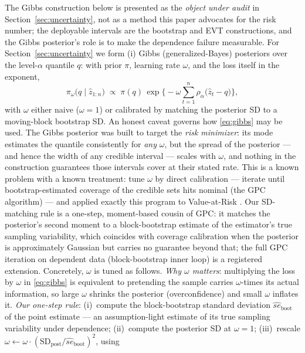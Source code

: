 \documentclass[11pt]{article}
\theoremstyle{remark}
\begin{document}
The Gibbs construction below is presented as the \emph{object under
audit} in Section~\ref{sec:uncertainty}, not as a method this paper
advocates for the risk number; the deployable intervals are the bootstrap
and EVT constructions, and the Gibbs posterior's role is to make the
dependence failure measurable. For Section~\ref{sec:uncertainty} we form (i) Gibbs (generalized-Bayes)
posteriors over the level-$\alpha$ quantile $q$: with prior $\pi$,
learning rate $\omega$, and the loss itself in the exponent,
\begin{equation}
\pi_\omega\big(q \mid \widehat{z}_{1:n}\big) \;\propto\;
\pi(q)\,
\exp\Big\{-\omega \sum_{t=1}^{n}
\rho_\alpha\big(\widehat{z}_t - q\big)\Big\},
\label{eq:gibbs}
\end{equation}
with $\omega$ either naive ($\omega=1$) or calibrated by matching the
posterior SD to a moving-block bootstrap SD. An honest caveat governs
how \eqref{eq:gibbs} may be used. The Gibbs posterior was built to
target the \emph{risk minimizer}: its mode estimates the quantile
consistently for \emph{any} $\omega$, but the spread of the posterior
--- and hence the width of any credible interval --- scales with
$\omega$, and nothing in the construction guarantees those intervals
cover at their stated rate. This is a known problem with a known
treatment: \citet{syring2019gpc} tune $\omega$ by direct calibration
--- iterate until bootstrap-estimated coverage of the credible sets
hits nominal (the GPC algorithm) --- and applied exactly this program
to Value-at-Risk \citep{syringmartin2019var}. Our SD-matching rule is a
one-step, moment-based cousin of GPC: it matches the posterior's
second moment to a block-bootstrap estimate of the estimator's true
sampling variability, which coincides with coverage calibration when
the posterior is approximately Gaussian but carries no guarantee
beyond that; the full GPC iteration on dependent data (block-bootstrap
inner loop) is a registered extension. Concretely, $\omega$ is tuned as
follows. \emph{Why $\omega$ matters}: multiplying the loss by $\omega$
in \eqref{eq:gibbs} is equivalent to pretending the sample carries
$\omega$-times its actual information, so large $\omega$ shrinks the
posterior (overconfidence) and small $\omega$ inflates it. \emph{Our
one-step rule}: (i)~compute the block-bootstrap standard deviation
$\widehat{se}_{\mathrm{boot}}$ of the point estimate --- an
assumption-light estimate of its true sampling variability under
dependence; (ii)~compute the posterior SD at $\omega=1$; (iii)~rescale
$\omega \leftarrow \omega \cdot
(\mathrm{SD}_{\mathrm{post}}/\widehat{se}_{\mathrm{boot}})^{2}$, using
\end{document}
